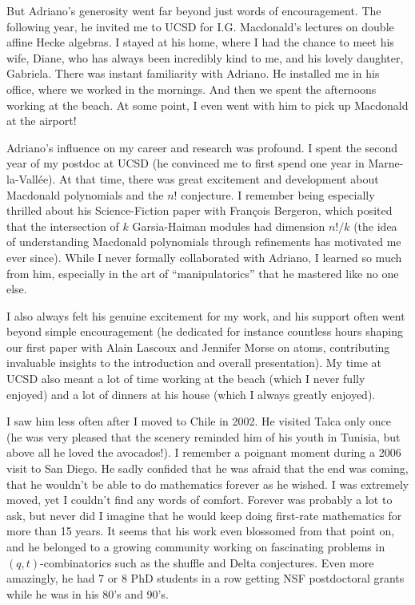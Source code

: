 \documentclass{notices}
\begin{document}
But Adriano's generosity went far beyond just words of encouragement. The following year, he invited me to UCSD for I.G. Macdonald's lectures on double affine Hecke algebras. I stayed at his home, where I had the chance to meet his wife, Diane, who has always been incredibly kind to me, and his lovely daughter, Gabriela.  There was instant familiarity with Adriano.  He installed me in his office, where we worked in the mornings. And then we spent the afternoons working at the beach.  At some point, I even went with him to pick up Macdonald at the airport!  

Adriano's influence on my career and research was profound. I spent the second year of my postdoc at UCSD (he convinced me to first spend one year in Marne-la-Vallée). At that time, there was great excitement and development about Macdonald polynomials and  the $n!$ conjecture. I remember being especially thrilled about his Science-Fiction paper with Fran\c{c}ois Bergeron, which posited that the intersection of $k$ Garsia-Haiman modules had dimension $n!/k$ (the idea of understanding Macdonald polynomials through refinements has motivated me ever since). While I never formally collaborated with Adriano, I learned so much from him, especially in the art of ``manipulatorics'' that he mastered like no one else. 

I also always felt his genuine excitement for my work, and  his support often went beyond simple encouragement (he dedicated for instance countless hours shaping our first paper with Alain Lascoux and Jennifer Morse on atoms, contributing invaluable insights to the introduction and overall presentation). My time at UCSD also meant a lot of time working at the beach (which I never fully enjoyed) and a lot of dinners at his house (which I always greatly enjoyed).

I saw him less often after I moved to Chile in 2002.  He visited Talca only once (he was very pleased that the scenery reminded him of his youth in Tunisia, but above all he loved the avocados!). I remember a poignant moment during a 2006 visit to San Diego. He sadly confided that he was afraid that the end was coming, that he wouldn't be able to do mathematics forever as he wished. I was extremely moved, yet I couldn't find any words of comfort. Forever was probably a lot to ask, but never did I imagine that he would keep doing first-rate mathematics for more than 15 years.  It seems that his work  even blossomed from that point on, and he belonged to a growing community working on fascinating problems in $(q,t)$-combinatorics such as the shuffle and Delta conjectures. Even more amazingly, he had 7 or 8 PhD students in a row getting NSF postdoctoral grants while he was in his 80's and 90's.
\end{document}
